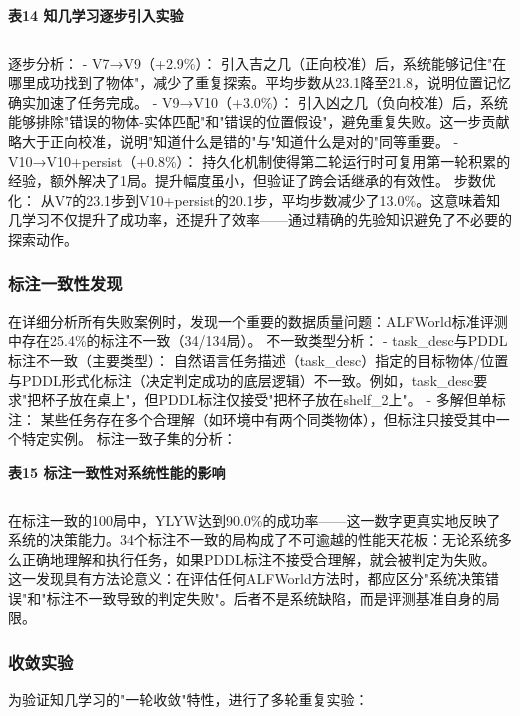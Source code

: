 \documentclass[12pt,a4paper]{article}
\begin{document}
\begin{center}
\textbf{表14  知几学习逐步引入实验}
\begin{tabular}{lcccc}
\hline
\end{tabular}
\end{center}
逐步分析：
- V7→V9（+2.9\%）： 引入吉之几（正向校准）后，系统能够记住"在哪里成功找到了物体"，减少了重复探索。平均步数从23.1降至21.8，说明位置记忆确实加速了任务完成。
- V9→V10（+3.0\%）： 引入凶之几（负向校准）后，系统能够排除"错误的物体-实体匹配"和"错误的位置假设"，避免重复失败。这一步贡献略大于正向校准，说明"知道什么是错的"与"知道什么是对的"同等重要。
- V10→V10+persist（+0.8\%）： 持久化机制使得第二轮运行时可复用第一轮积累的经验，额外解决了1局。提升幅度虽小，但验证了跨会话继承的有效性。
步数优化： 从V7的23.1步到V10+persist的20.1步，平均步数减少了13.0\%。这意味着知几学习不仅提升了成功率，还提升了效率——通过精确的先验知识避免了不必要的探索动作。

\subsubsection{标注一致性发现}
在详细分析所有失败案例时，发现一个重要的数据质量问题：ALFWorld标准评测中存在25.4\%的标注不一致（34/134局）。
不一致类型分析：
- task\_desc与PDDL标注不一致（主要类型）： 自然语言任务描述（task\_desc）指定的目标物体/位置与PDDL形式化标注（决定判定成功的底层逻辑）不一致。例如，task\_desc要求"把杯子放在桌上"，但PDDL标注仅接受"把杯子放在shelf\_2上"。
- 多解但单标注： 某些任务存在多个合理解（如环境中有两个同类物体），但标注只接受其中一个特定实例。
标注一致子集的分析：

\begin{center}
\textbf{表15  标注一致性对系统性能的影响}
\begin{tabular}{lcccc}
\hline
\end{tabular}
\end{center}
在标注一致的100局中，YLYW达到90.0\%的成功率——这一数字更真实地反映了系统的决策能力。34个标注不一致的局构成了不可逾越的性能天花板：无论系统多么正确地理解和执行任务，如果PDDL标注不接受合理解，就会被判定为失败。
这一发现具有方法论意义：在评估任何ALFWorld方法时，都应区分"系统决策错误"和"标注不一致导致的判定失败"。后者不是系统缺陷，而是评测基准自身的局限。

\subsubsection{收敛实验}
为验证知几学习的"一轮收敛"特性，进行了多轮重复实验：
\end{document}
